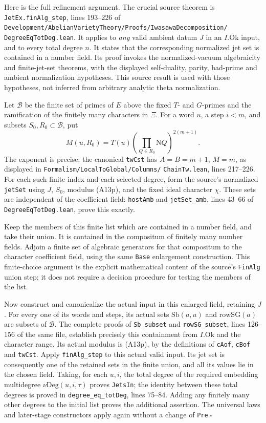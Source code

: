 Here is the full refinement argument.  The crucial
source theorem is \texttt{JetEx.finAlg\_step},
lines 193--226 of
\texttt{Development/AbelianVarietyTheory/Proofs/IwasawaDecomposition/}
\texttt{DegreeEqTotDeg.lean}.  It applies to \emph{any}
valid ambient datum $J$ in an $I.\mathrm{Ok}$ input,
and to every total degree $n$.  It states that the
corresponding normalized jet set is contained in a
number field.  Its proof invokes the normalized-vacuum
algebraicity and finite-jet-set theorems, with the
displayed self-duality, parity, bad-prime and ambient
normalization hypotheses.  This source result is used
with those hypotheses, not inferred from arbitrary
analytic theta normalization.

Let $\mathcal B$ be the finite set of primes of $E$
above the fixed $T$- and $G$-primes and the ramification
of the finitely many characters in $\Xi$.
For a word $u$, a step $i<m$, and subsets
$S_0,R_0\subset\mathcal B$, put
\[
 M(u,R_0)=T(u)
             \left(\prod_{Q\in R_0}\mathrm NQ\right)^{2(m+1)}.
 \tag{A13p}
\]
The exponent is precise: the canonical
\texttt{twCst} has $A=B=m+1$, $M=m$,
as displayed in \texttt{Formalism/LocalToGlobal/Columns/}
\texttt{ChainTw.lean}, lines 217--226.
For each such finite index and each selected degree,
form the source's normalized \texttt{jetSet} using
$J$, $S_0$, modulus (A13p), and the fixed ideal
character $\chi$.  These sets are independent of the
coefficient field: \texttt{hostAmb} and
\texttt{jetSet\_amb}, lines 43--66 of
\texttt{DegreeEqTotDeg.lean}, prove this exactly.

Keep the members of this finite list which are
contained in a number field, and take their union.
It is contained in the compositum of finitely many
number fields.  Adjoin a finite set of algebraic
generators for that compositum to the character
coefficient field, using the same \texttt{Base}
enlargement construction.  This finite-choice argument
is the explicit mathematical content of the source's
\texttt{FinAlg} union step; it does not require a
decision procedure for testing the members of the list.

Now construct and canonicalize the actual input in
this enlarged field, retaining $J$.  For every one of
its words and steps, its actual sets
$\mathrm{Sb}(a,u)$ and $\mathrm{rowSG}(a)$ are subsets
of $\mathcal B$.  The complete proofs of
\texttt{Sb\_subset} and \texttt{rowSG\_subset},
lines 126--156 of the same file, establish precisely
this containment from $I.\mathrm{Ok}$ and the character
range.  Its actual modulus is (A13p), by the definitions
of \texttt{cAof}, \texttt{cBof} and \texttt{twCst}.
Apply \texttt{finAlg\_step} to this actual valid input.
Its jet set is consequently one of the retained sets
in the finite union, and all its values lie in the
chosen field.  Taking, for each $u,i$, the total degree
of the required embedding multidegree
$\nu\mathrm{Deg}(u,i,\tau)$ proves
\texttt{JetsIn}; the identity between these total
degrees is proved in \texttt{degree\_eq\_totDeg},
lines 75--84.  Adding any finitely many other degrees
to the initial list proves the additional assertion.
The universal laws and later-stage constructors apply
again without a change of \texttt{Pre}.\hfill$\square$

